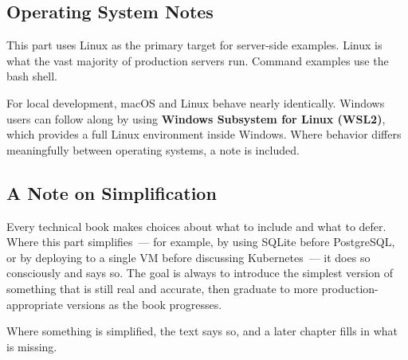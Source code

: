 \subsection*{Operating System Notes}\label{part4-introduction:operating-system-notes}

This part uses Linux as the primary target for server-side examples. Linux is what the vast majority of production servers run. Command examples use the bash shell.

For local development, macOS and Linux behave nearly identically. Windows users can follow along by using \textbf{Windows Subsystem for Linux (WSL2)}, which provides a full Linux environment inside Windows. Where behavior differs meaningfully between operating systems, a note is included.

\subsection*{A Note on Simplification}\label{part4-introduction:a-note-on-simplification}

Every technical book makes choices about what to include and what to defer. Where this part simplifies~--- for example, by using SQLite before PostgreSQL, or by deploying to a single VM before discussing Kubernetes~--- it does so consciously and says so. The goal is always to introduce the simplest version of something that is still real and accurate, then graduate to more production-appropriate versions as the book progresses.

Where something is simplified, the text says so, and a later chapter fills in what is missing.
